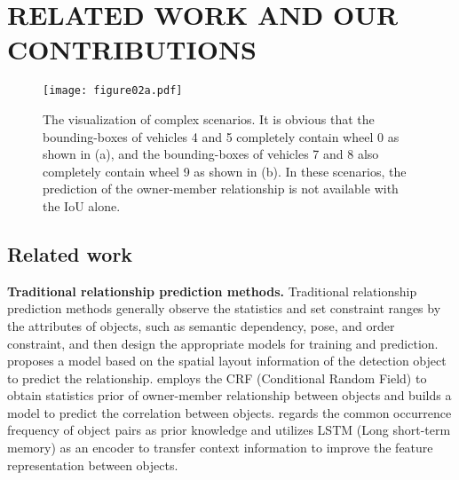 \documentclass{article}
\begin{document}


\section{RELATED WORK AND OUR CONTRIBUTIONS}
%  
\begin{figure}[!t]
    \centering
    \texttt{[image: figure02a.pdf]}
    \caption{The visualization of complex scenarios. It is obvious that the bounding-boxes of vehicles 4 and 5 completely contain wheel 0 as shown in (a), and the bounding-boxes of vehicles 7 and 8 also completely contain wheel 9 as shown in (b). In these scenarios, the prediction of the owner-member relationship is not available with the IoU alone.}
    \label{fig:Figure02}
\end{figure}

\subsection{Related work}
\textbf{Traditional relationship prediction methods.}
Traditional relationship prediction methods generally observe the statistics and set constraint ranges by the attributes of objects, such as semantic dependency, pose, and order constraint, and then design the appropriate models for training and prediction. \cite{article3} proposes a model based on the spatial layout information of the detection object to predict the relationship. \cite{article4} employs the CRF (Conditional Random Field) \cite{article25} to obtain statistics prior of owner-member relationship between objects and builds a model to predict the correlation between objects. \cite{article5} regards the common occurrence frequency of object pairs as prior knowledge and utilizes LSTM (Long short-term memory) \cite{article26} as an encoder to transfer context information to improve the feature representation between objects.
\end{document}
